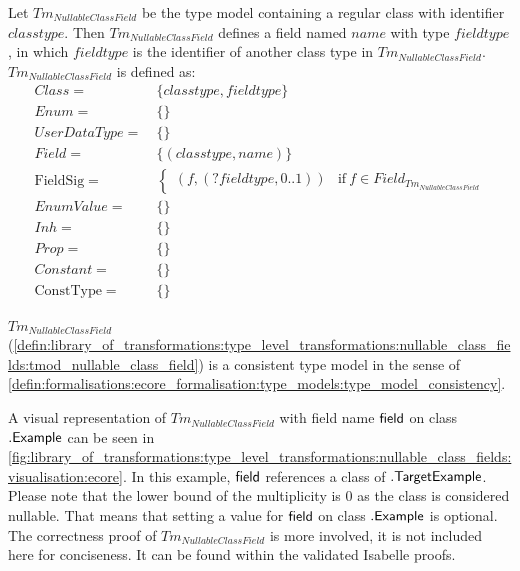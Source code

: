 \begin{defin}
\label{defin:library_of_transformations:type_level_transformations:nullable_class_fields:tmod_nullable_class_field}
Let $Tm_{NullableClassField}$ be the type model containing a regular class with identifier $classtype$. Then $Tm_{NullableClassField}$ defines a field named $name$ with type $fieldtype$, in which $fieldtype$ is the identifier of another class type in $Tm_{NullableClassField}$. $Tm_{NullableClassField}$ is defined as:
\begin{align*}
Class =\ &\{classtype, fieldtype\} \\
Enum =\ &\{\} \\
UserDataType =\ &\{\} \\
Field =\ &\{(classtype, name)\} \\
\mathrm{FieldSig} =\ &\begin{cases}
    (f, (?fieldtype, 0..1)) &\mathrm{if}\ f \in Field_{Tm_{NullableClassField}}
\end{cases} \\
EnumValue =\ &\{\} \\
Inh =\ &\{\} \\
Prop =\ &\{\} \\
Constant =\ &\{\} \\
\mathrm{ConstType} =\ &\{\}
\end{align*}
\end{defin}

\begin{thm}
\label{defin:library_of_transformations:type_level_transformations:nullable_class_fields:tmod_nullable_class_field_correct}
$Tm_{NullableClassField}$ (\cref{defin:library_of_transformations:type_level_transformations:nullable_class_fields:tmod_nullable_class_field}) is a consistent type model in the sense of \cref{defin:formalisations:ecore_formalisation:type_models:type_model_consistency}.
\end{thm}

A visual representation of $Tm_{NullableClassField}$ with field name $\mathsf{field}$ on class $.\mathsf{Example}$ can be seen in \cref{fig:library_of_transformations:type_level_transformations:nullable_class_fields:visualisation:ecore}. In this example, $\mathsf{field}$ references a class of $.\mathsf{TargetExample}$. Please note that the lower bound of the multiplicity is 0 as the class is considered nullable. That means that setting a value for $\mathsf{field}$ on class $.\mathsf{Example}$ is optional. The correctness proof of $Tm_{NullableClassField}$ is more involved, it is not included here for conciseness. It can be found within the validated Isabelle proofs.

